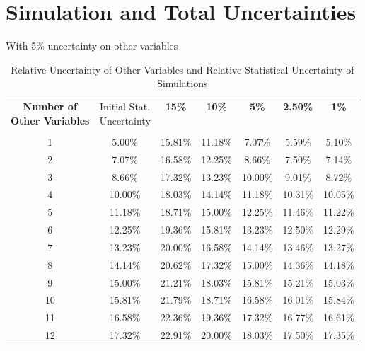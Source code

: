 \chapter{Simulation and Total Uncertainties}\label{app:f}

With 5\% uncertainty on other variables
\begin{table}[htb]
    \centering
    \begin{tabular}{c|cccccc}
        \headercell{\textbf{Number of} \\ \textbf{Other Variables}} & \headercell{Initial Stat. \\ Uncertainty} & \textbf{15\%} & \textbf{10\%} & \textbf{5\%} & \textbf{2.50\%} & \textbf{1\%} \\ \\ \hline
        1 & 5.00\% & 15.81\% & 11.18\% & 7.07\% & 5.59\% & 5.10\% \\
        2 & 7.07\% & 16.58\% & 12.25\% & 8.66\% & 7.50\% & 7.14\% \\
        3 & 8.66\% & 17.32\% & 13.23\% & 10.00\% & 9.01\% & 8.72\% \\
        4 & 10.00\% & 18.03\% & 14.14\% & 11.18\% & 10.31\% & 10.05\% \\
        5 & 11.18\% & 18.71\% & 15.00\% & 12.25\% & 11.46\% & 11.22\% \\
        6 & 12.25\% & 19.36\% & 15.81\% & 13.23\% & 12.50\% & 12.29\% \\
        7 & 13.23\% & 20.00\% & 16.58\% & 14.14\% & 13.46\% & 13.27\% \\
        8 & 14.14\% & 20.62\% & 17.32\% & 15.00\% & 14.36\% & 14.18\% \\
        9 & 15.00\% & 21.21\% & 18.03\% & 15.81\% & 15.21\% & 15.03\% \\
        10 & 15.81\% & 21.79\% & 18.71\% & 16.58\% & 16.01\% & 15.84\% \\
        11 & 16.58\% & 22.36\% & 19.36\% & 17.32\% & 16.77\% & 16.61\% \\
        12 & 17.32\% & 22.91\% & 20.00\% & 18.03\% & 17.50\% & 17.35\% \\
    \end{tabular}
    \caption{Relative Uncertainty of Other Variables and Relative Statistical Uncertainty of Simulations}
    \label{table:uncertainties}
\end{table}



